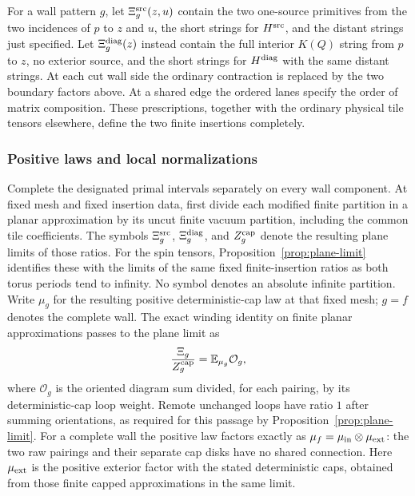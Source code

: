 For a wall pattern $g$, let $\Xi_g^{\rm src}(z,u)$ contain the two
one-source primitives from the two incidences of $p$ to $z$ and $u$,
the short strings for $H^{\rm src}$, and the distant strings just
specified.  Let $\Xi_g^{\rm diag}(z)$ instead contain the full
interior $K(Q)$ string from $p$ to $z$, no exterior source, and the
short strings for $H^{\rm diag}$ with the same distant strings.
At each cut wall side the ordinary contraction is replaced by the
two boundary factors above.  At a shared edge the ordered lanes
specify the order of matrix composition.  These prescriptions,
together with the ordinary physical tile tensors elsewhere, define
the two finite insertions completely.

\subsubsection{Positive laws and local normalizations}

Complete the designated primal intervals separately on every wall
component.  At fixed mesh and fixed insertion data, first divide each
modified finite partition in a planar approximation by its uncut
finite vacuum partition, including the common tile coefficients.
The symbols $\Xi_g^{\rm src}$, $\Xi_g^{\rm diag}$, and
$Z_g^{\rm cap}$ denote the resulting plane limits of those ratios.
For the spin tensors, Proposition~\ref{prop:plane-limit} identifies
these with the limits of the same fixed finite-insertion ratios
as both torus periods tend to infinity.  No symbol denotes an
absolute infinite partition.
Write $\mu_g$ for the resulting positive deterministic-cap law at
that fixed mesh; $g=f$ denotes the complete wall.  The exact winding
identity on finite planar approximations passes to the plane limit as
\begin{equation}
 \frac{\Xi_g}{Z_g^{\rm cap}}=\mathbb E_{\mu_g}\mathcal O_g,
 \label{obs:diagram-normalization}
\end{equation}
where $\mathcal O_g$ is the oriented diagram sum divided, for each
pairing, by its deterministic-cap loop weight.  Remote unchanged
loops have ratio $1$ after summing orientations, as required for
this passage by Proposition~\ref{prop:plane-limit}.
For a complete wall the positive law factors exactly as
$\mu_f=\mu_{\rm in}\otimes\mu_{\rm ext}$: the two raw pairings and
their separate cap disks have no shared connection.  Here
$\mu_{\rm ext}$ is the positive exterior factor with the stated
deterministic caps, obtained from those finite capped
approximations in the same limit.

